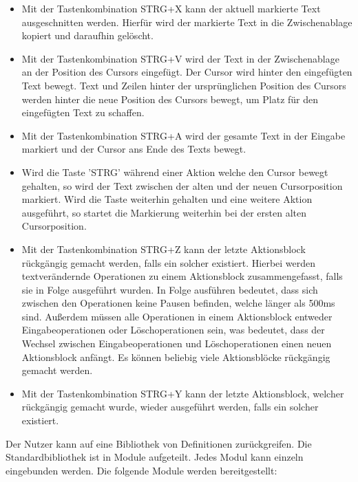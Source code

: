 \documentclass[parskip=full,11pt,twoside]{scrartcl}
\begin{document}
\begin{itemize}
	\item Mit der Tastenkombination STRG+X kann der aktuell markierte Text ausgeschnitten werden. Hierfür wird der markierte Text in die Zwischenablage kopiert und daraufhin gelöscht.
	\item Mit der Tastenkombination STRG+V wird der Text in der Zwischenablage an der Position des Cursors eingefügt. Der Cursor wird hinter den eingefügten Text bewegt. Text und Zeilen hinter der ursprünglichen Position des Cursors werden hinter die neue Position des Cursors bewegt, um Platz für den eingefügten Text zu schaffen.
	\item Mit der Tastenkombination STRG+A wird der gesamte Text in der Eingabe markiert und der Cursor ans Ende des Texts bewegt.
	\item Wird die Taste 'STRG' während einer Aktion welche den Cursor bewegt gehalten, so wird der Text zwischen der alten und der neuen Cursorposition markiert. Wird die Taste weiterhin gehalten und eine weitere Aktion ausgeführt, so startet die Markierung weiterhin bei der ersten alten Cursorposition.
	\item Mit der Tastenkombination STRG+Z kann der letzte Aktionsblock rückgängig gemacht werden, falls ein solcher existiert. 
	Hierbei werden textverändernde Operationen zu einem Aktionsblock zusammengefasst, falls sie in Folge ausgeführt wurden. In Folge ausführen bedeutet, dass sich zwischen den Operationen keine Pausen befinden, welche länger als 500ms sind. Außerdem müssen alle Operationen in einem Aktionsblock entweder Eingabeoperationen oder Löschoperationen sein, was bedeutet, dass der Wechsel zwischen Eingabeoperationen und Löschoperationen einen neuen Aktionsblock anfängt.
	Es können beliebig viele Aktionsblöcke rückgängig gemacht werden.
	\item Mit der Tastenkombination STRG+Y kann der letzte Aktionsblock, welcher rückgängig gemacht wurde, wieder ausgeführt werden, falls ein solcher existiert.
\end{itemize}

Der Nutzer kann auf eine Bibliothek von Definitionen zurückgreifen. Die Standardbibliothek
ist in Module aufgeteilt. Jedes Modul kann einzeln eingebunden werden. Die folgende
Module werden bereitgestellt:
\end{document}
